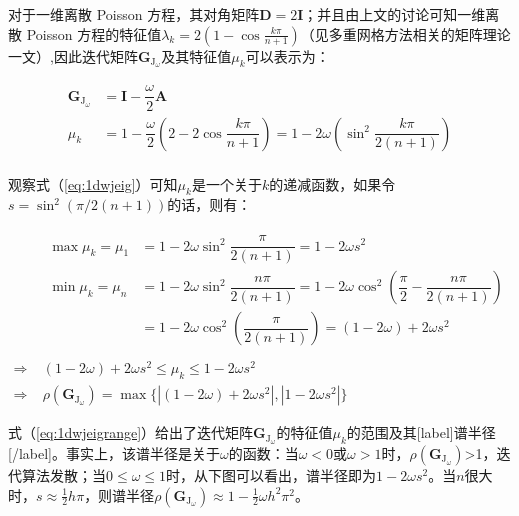 \documentclass[12pt, UTF8, nofonts]{ctexart}
\begin{document}
对于一维离散 Poisson 方程，其对角矩阵$\boldsymbol{D}=2\boldsymbol{I}$；并且由上文的讨论可知一维离散 Poisson 方程的特征值$\lambda_k=2(1-\cos\frac{k\pi}{n+1})$（见多重网格方法相关的矩阵理论一文）,因此迭代矩阵$\boldsymbol{G}_{\mathrm{J}_\omega}$及其特征值$\mu_k$可以表示为：

\begin{equation}
  \label{eq:1dwjeig}
  \begin{aligned}
    \boldsymbol{G}_{\mathrm{J}_\omega} &= \boldsymbol{I} - \dfrac{\omega}{2}\boldsymbol{A} \\
    \mu_k &= 1 - \dfrac{\omega}{2}(2-2\cos\dfrac{k\pi}{n+1}) = 1 - 2\omega\left(\sin^2\dfrac{k\pi}{2(n+1)}\right) \\
  \end{aligned}
\end{equation}

观察式（\ref{eq:1dwjeig}）可知$\mu_k$是一个关于$k$的递减函数，如果令$s=\sin^2\left(\pi/2(n+1)\right)$的话，则有：

\begin{equation}
  \label{eq:1dwjeigrange}
  \begin{aligned}
    & \begin{aligned}
      \max{\mu_k} = \mu_{1} &= 1 - 2\omega\sin^2\dfrac{\pi}{2(n+1)} = 1 - 2\omega s^2 \\
      \min{\mu_k} = \mu_{n} &= 1 - 2\omega\sin^2\dfrac{n\pi}{2(n+1)} = 1 - 2\omega\cos^2\left(\dfrac{\pi}{2}-\dfrac{n\pi}{2(n+1)}\right) \\
      &= 1 - 2\omega\cos^2\left(\dfrac{\pi}{2(n+1)}\right) = (1-2\omega) + 2\omega s^2 \\
    \end{aligned} \\
    \Rightarrow \; & (1-2\omega)+2\omega s^2 \leq \mu_k \leq 1 - 2\omega s^2 \\
    \Rightarrow \; & \rho(\boldsymbol{G}_{\mathrm{J}_\omega}) = \max\Big\{|(1-2\omega)+2\omega s^2|,|1-2\omega s^2|\Big\}
  \end{aligned}
\end{equation}

式（\ref{eq:1dwjeigrange}）给出了迭代矩阵$\boldsymbol{G}_{\mathrm{J}_\omega}$的特征值$\mu_k$的范围及其[label]谱半径[/label]。事实上，该谱半径是关于$\omega$的函数：当$\omega<0$或$\omega>1$时，$\rho(\boldsymbol{G}_{\mathrm{J}_\omega})$>1，迭代算法发散；当$0\leq\omega\leq1$时，从下图可以看出，谱半径即为$1-2\omega s^2$。当$n$很大时，$s\approx\frac{1}{2}h\pi$，则谱半径$\rho(\boldsymbol{G}_{\mathrm{J}_\omega}) \approx 1-\frac{1}{2}\omega h^2\pi^2$。
\end{document}

